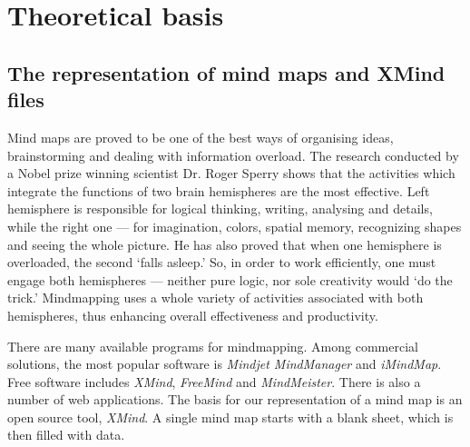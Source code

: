 %
%
%
%
%

\chapter{Theoretical basis}
\label{chap:theory}

\section{The representation of mind maps and XMind files}
\label{sec:xmind}

Mind maps are proved to be one of the best ways of organising ideas, brainstorming and dealing with information overload. The research conducted by a Nobel prize winning scientist Dr. Roger Sperry shows that the activities which integrate the functions of two brain hemispheres are the most effective. \cite{Voneida:1998:Sperry} Left hemisphere is responsible for logical thinking, writing, analysing and details, while the right one --- for imagination, colors, spatial memory, recognizing shapes and seeing the whole picture. He has also proved that when one hemisphere is overloaded, the second `falls asleep.' So, in order to work efficiently, one must engage both hemispheres --- neither pure logic, nor sole creativity would `do the trick.' Mindmapping uses a whole variety of activities associated with both hemispheres, thus enhancing overall effectiveness and productivity.

There are many available programs for mindmapping. Among commercial solutions, the most popular software is {\em Mindjet MindManager} and {\em iMindMap}. Free software includes {\em XMind}, {\em FreeMind} and \emph{MindMeister}. There is also a number of web applications. The basis for our representation of a mind map is an open source tool, {\em XMind}. A single mind map starts with a blank sheet, which is then filled with data.

